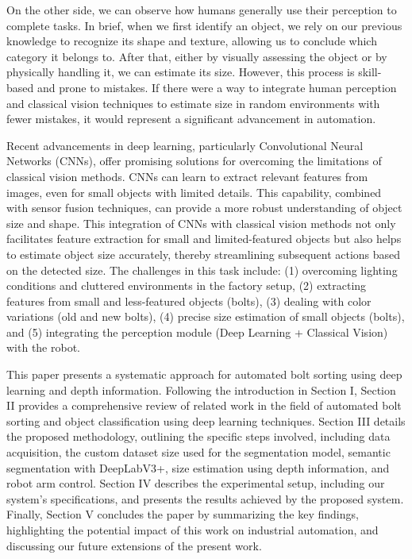 \documentclass[letterpaper, 10 pt, conference]{ieeeconf}  %
\begin{document}
On the other side, we can observe how humans generally use their perception to complete tasks. In brief, when we first identify an object, we rely on our previous knowledge to recognize its shape and texture, allowing us to conclude which category it belongs to. After that, either by visually assessing the object or by physically handling it, we can estimate its size. However, this process is skill-based and prone to mistakes. If there were a way to integrate human perception and classical vision techniques to estimate size in random environments with fewer mistakes, it would represent a significant advancement in automation.

Recent advancements in deep learning, particularly Convolutional Neural Networks (CNNs), offer promising solutions for overcoming the limitations of classical vision methods. CNNs can learn to extract relevant features from images, even for small objects with limited details. This capability, combined with sensor fusion techniques, can provide a more robust understanding of object size and shape. This integration of CNNs with classical vision methods not only facilitates feature extraction for small and limited-featured objects but also helps to estimate object size accurately, thereby streamlining subsequent actions based on the detected size. The challenges in this task include: (1) overcoming lighting conditions and cluttered environments in the factory setup, (2) extracting features from small and less-featured objects (bolts), (3) dealing with color variations (old and new bolts), (4) precise size estimation of small objects (bolts), and (5) integrating the perception module (Deep Learning + Classical Vision) with the robot.

This paper presents a systematic approach for automated bolt sorting using deep learning and depth information. Following the introduction in Section I, Section II provides a comprehensive review of related work in the field of automated bolt sorting and object classification using deep learning techniques. Section III details the proposed methodology, outlining the specific steps involved, including data acquisition, the custom dataset size used for the segmentation model, semantic segmentation with DeepLabV3+, size estimation using depth information, and robot arm control. Section IV describes the experimental setup, including our system's specifications, and presents the results achieved by the proposed system. Finally, Section V concludes the paper by summarizing the key findings, highlighting the potential impact of this work on industrial automation, and discussing our future extensions of the present work. 
\newpage
\end{document}
